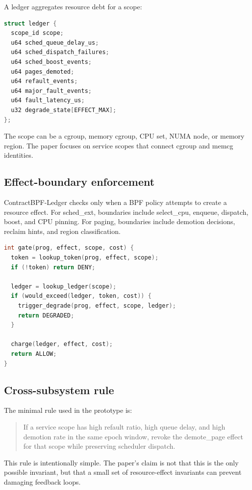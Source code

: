 \documentclass[letterpaper,twocolumn,10pt]{article}
\newcommand{\sys}{ContractBPF-Ledger\xspace}
\begin{document}
A ledger aggregates resource debt for a scope:

\begin{lstlisting}[language=C,basicstyle=\ttfamily\small]
struct ledger {
  scope_id scope;
  u64 sched_queue_delay_us;
  u64 sched_dispatch_failures;
  u64 sched_boost_events;
  u64 pages_demoted;
  u64 refault_events;
  u64 major_fault_events;
  u64 fault_latency_us;
  u32 degrade_state[EFFECT_MAX];
};
\end{lstlisting}

The scope can be a cgroup, memory cgroup, CPU set, NUMA node, or memory region. The paper focuses on service scopes that connect cgroup and memcg identities.

\subsection{Effect-boundary enforcement}

\sys checks only when a BPF policy attempts to create a resource effect. For sched\_ext, boundaries include select\_cpu, enqueue, dispatch, boost, and CPU pinning. For paging, boundaries include demotion decisions, reclaim hints, and region classification.

\begin{lstlisting}[language=C,basicstyle=\ttfamily\footnotesize]
int gate(prog, effect, scope, cost) {
  token = lookup_token(prog, effect, scope);
  if (!token) return DENY;

  ledger = lookup_ledger(scope);
  if (would_exceed(ledger, token, cost)) {
    trigger_degrade(prog, effect, scope, ledger);
    return DEGRADED;
  }

  charge(ledger, effect, cost);
  return ALLOW;
}
\end{lstlisting}

\subsection{Cross-subsystem rule}

The minimal rule used in the prototype is:

\begin{quote}
If a service scope has high refault ratio, high queue delay, and high demotion rate in the same epoch window, revoke the demote\_page effect for that scope while preserving scheduler dispatch.
\end{quote}

This rule is intentionally simple. The paper's claim is not that this is the only possible invariant, but that a small set of resource-effect invariants can prevent damaging feedback loops.
\end{document}

